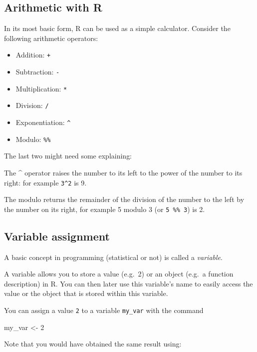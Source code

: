 \documentclass[
]{book}
\newenvironment{Shaded}{\begin{snugshade}}{\end{snugshade}}
\newcommand{\DecValTok}[1]{\textcolor[rgb]{0.00,0.00,0.81}{#1}}
\newcommand{\NormalTok}[1]{#1}
\newcommand{\OtherTok}[1]{\textcolor[rgb]{0.56,0.35,0.01}{#1}}
\providecommand{\tightlist}{%
  \setlength{\itemsep}{0pt}\setlength{\parskip}{0pt}}
\begin{document}
\subsection{Arithmetic with R}\label{arithmetic-with-r}

In its most basic form, R can be used as a simple calculator. Consider the following arithmetic operators:

\begin{itemize}
\tightlist
\item
  Addition: \texttt{+}
\item
  Subtraction: \texttt{-}
\item
  Multiplication: \texttt{*}
\item
  Division: \texttt{/}
\item
  Exponentiation: \texttt{\^{}}
\item
  Modulo: \texttt{\%\%}
\end{itemize}

The last two might need some explaining:

The \^{} operator raises the number to its left to the power of the number to its right: for example \texttt{3\^{}2} is 9.

The modulo returns the remainder of the division of the number to the left by the number on its right, for example 5 modulo 3 (or \texttt{5\ \%\%\ 3}) is 2.

\subsection{Variable assignment}\label{variable-assignment}

A basic concept in programming (statistical or not) is called a \emph{variable}.

A variable allows you to store a value (e.g.~2) or an object (e.g.~a function description) in R. You can then later use this variable's name to easily access the value or the object that is stored within this variable.

You can assign a value \texttt{2} to a variable \texttt{my\_var} with the command

\begin{Shaded}
\begin{Highlighting}[]
\NormalTok{my\_var }\OtherTok{\textless{}{-}} \DecValTok{2}
\end{Highlighting}
\end{Shaded}

Note that you would have obtained the same result using:
\end{document}
